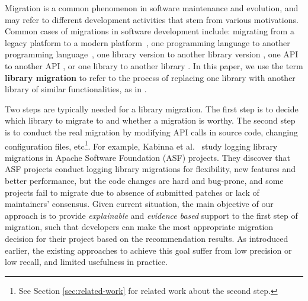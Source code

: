 \documentclass[conference, 10pt]{IEEEtran}
\begin{document}
Migration is a common phenomenon in software maintenance and evolution, and may refer to different development activities that stem from various motivations. 
Common cases of migrations in software development include: migrating from a legacy platform to a modern platform~\cite{2007MODEL-Fleurey-Model, 2019SANER-Verhaeghe-GUIMigration}, one programming language to another programming language~\cite{2013FSE-Nguyen-Lexical, 2014ASE-Nguyen-Statistical, 2015ASE-Nguyen-DivideAndConquer, 2016ICSE-Nguyen-Mapping, 2016ICSM-Nguyen-Context, 2017SANER-Dorninger-Multi, 2019FSE-Bui-SAR}, one library version to another library version \cite{2012FSE-Cossette-Seeking, 2018EMSE-Kula-Do}, one API to another API \cite{2010ICSE-Nita-Using, 2010OOPSLA-Kapur-Refactoring, 2013WCRE-Teyton-Automatic, 2013ICSE-Gokhale-Inferring, 2014TOSEM-Santhiar-Mining, 2015ICSME-Hora-Apiwave, 2019ICPC-Alrubaye-On, 2019TSE-Chen-Mining}, or one library to another library \cite{2009SLE-Bartolomei-Study, 2010ICSM-Bartolomei-Swing, 2012WCRE-Teyton-Mining, 2014JournalOfSysAndSoft-Teyton-Study, 2016MSR-Kabinna-Logging, 2019ICSME-Alrubaye-MigrationMiner}. 
In this paper, we use the term \textbf{library migration} to refer to the process of replacing one library with another library of similar functionalities, as in \cite{2012WCRE-Teyton-Mining, 2013WCRE-Teyton-Automatic, 2014JournalOfSysAndSoft-Teyton-Study, 2016MSR-Kabinna-Logging, 2019ICPC-Alrubaye-On, 2019ICSME-Alrubaye-MigrationMiner, 2019Arxiv-Alrubaye-How, 2020ASC-Alrubaye-Learning}.

Two steps are typically needed for a library migration. The first step is to decide which library to migrate to and whether a migration is worthy. 
The second step is to conduct the real migration by modifying API calls in source code, changing configuration files, etc\footnote{See Section \ref{sec:related-work} for related work about the second step.}. 
For example, Kabinna et al.~\cite{2016MSR-Kabinna-Logging} study logging library migrations in Apache Software Foundation (ASF) projects. 
They discover that ASF projects conduct logging library migrations for flexibility, new features and better performance, but the code changes are hard and bug-prone, and 
some projects fail to migrate due to absence of submitted patches or lack of maintainers' consensus. 
Given current situation, the main objective of our approach is to provide \textit{explainable} and \textit{evidence based} support to the first step of migration, such that developers can make the most appropriate migration decision for their project based on the recommendation results.
As introduced earlier, the existing approaches to achieve this goal suffer from low precision or low recall, and limited usefulness in practice.
\end{document}
